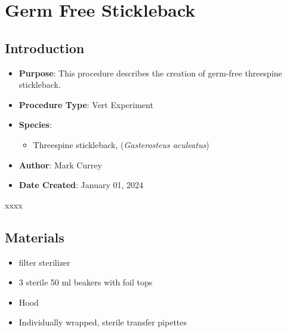 \documentclass[
  letterpaper,
  DIV=11,
  numbers=noendperiod]{scrreprt}
\providecommand{\tightlist}{%
  \setlength{\itemsep}{0pt}\setlength{\parskip}{0pt}}\usepackage{longtable,booktabs,array}
\begin{document}
\hypertarget{sec-vert_exp-gremfree_SB}{%
\chapter{Germ Free Stickleback}\label{sec-vert_exp-gremfree_SB}}

\hypertarget{introduction-76}{%
\section{Introduction}\label{introduction-76}}

\begin{itemize}
\tightlist
\item
  \textbf{Purpose}: This procedure describes the creation of germ-free
  threespine stickleback.
\item
  \textbf{Procedure Type}: Vert Experiment
\item
  \textbf{Species}:

  \begin{itemize}
  \tightlist
  \item
    Threespine stickleback, (\emph{Gasterosteus aculeatus})
  \end{itemize}
\item
  \textbf{Author}: Mark Currey
\item
  \textbf{Date Created}: January 01, 2024
\end{itemize}

\begin{tcolorbox}[enhanced jigsaw, toprule=.15mm, breakable, coltitle=black, leftrule=.75mm, title=\textcolor{quarto-callout-warning-color}{\faExclamationTriangle}\hspace{0.5em}{NOTES}, bottomrule=.15mm, toptitle=1mm, bottomtitle=1mm, colframe=quarto-callout-warning-color-frame, opacityback=0, colback=white, opacitybacktitle=0.6, colbacktitle=quarto-callout-warning-color!10!white, rightrule=.15mm, titlerule=0mm, arc=.35mm, left=2mm]

xxxx

\end{tcolorbox}

\hypertarget{materials-72}{%
\section{Materials}\label{materials-72}}

\begin{itemize}
\tightlist
\item
  filter sterilizer
\item
  3 sterile 50 ml beakers with foil tops
\item
  Hood
\item
  Individually wrapped, sterile transfer pipettes
\end{itemize}
\end{document}
